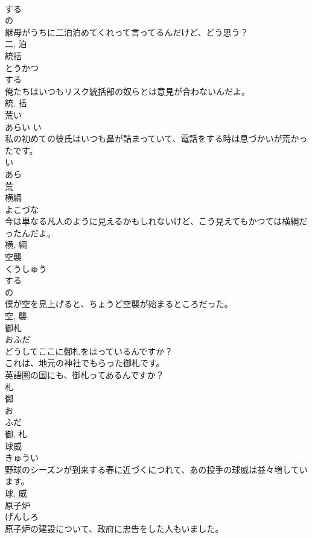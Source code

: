 \documentclass[8pt]{extreport}
\begin{document}
\begin{CJK}{UTF8}{min}
\\	する 
\\	の 
\\	継母がうちに二泊泊めてくれって言ってるんだけど、どう思う？	
\\	二, 泊	
\\	統括	
\\	とうかつ	
\\	する 
\\	俺たちはいつもリスク統括部の奴らとは意見が合わないんだよ。	
\\	統, 括	
\\	荒い	
\\	あらい	い 
\\	私の初めての彼氏はいつも鼻が詰まっていて、電話をする時は息づかいが荒かったです。	
\\	い 
\\	あら 
\\	荒	
\\	横綱	
\\	よこづな	
\\	今は単なる凡人のように見えるかもしれないけど、こう見えてもかつては横綱だったんだよ。	
\\	横, 綱	
\\	空襲	
\\	くうしゅう	
\\	する 
\\	の 
\\	僕が空を見上げると、ちょうど空襲が始まるところだった。	
\\	空, 襲	
\\	御札	
\\	おふだ	
\\	どうしてここに御札をはっているんですか？	
\\	これは、地元の神社でもらった御札です。	
\\	英語圏の国にも、御札ってあるんですか？	
\\	札 
\\	御 
\\	お 
\\	ふだ 
\\	御, 札	
\\	球威	
\\	きゅうい	
\\	野球のシーズンが到来する春に近づくにつれて、あの投手の球威は益々増しています。	
\\	球, 威	
\\	原子炉	
\\	げんしろ	
\\	原子炉の建設について、政府に忠告をした人もいました。	

\end{CJK}
\end{document}
